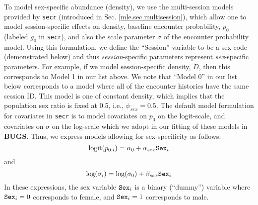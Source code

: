 To model sex-specific abundance (density), we  use the multi-session models  provided by
\mbox{\tt secr} (introduced in Sec. \ref{mle.sec.multisession}), which
allow one to model session-specific effects on density, baseline
encounter probability, $p_{0}$ (labeled $g_{0}$ in \mbox{\tt secr}), and also the scale
parameter $\sigma$ of the encounter probability model. Using this
formulation, we define the ``Session'' variable to be a sex code
(demonstrated below) and
thus {\it session}-specific parameters represent {\it sex}-specific parameters.
For example, if we model session-specific density, $D$, then this
corresponds to Model 1 in our list above.  We note that ``Model 0'' in
our list below corresponds to a model where all of the encounter
histories have the same session ID. This model is one of constant
density, which implies that the population sex ratio is fixed at 0.5, i.e.,
$\psi_{sex} = 0.5$. 
The default model formulation for covariates in \mbox{\tt secr} is to model covariates on $p_{0}$ on
the logit-scale, and covariates on $\sigma$ on the
log-scale which we adopt in our fitting of these models in {\bf
  BUGS}. Thus,  we express  models allowing for sex-specificity
as follows:
\[
 \mbox{logit}(p_{0,i}) = \alpha_{0} + \alpha_{sex} \mbox{\tt Sex}_{i}
\]
and
\[
 \mbox{log}(\sigma_{i}) = \log(\sigma_{0}) + \beta_{sex} \mbox{\tt Sex}_{i}
\]
In these expressions, the sex variable $\mbox{\tt Sex}_{i}$ is a
binary (``dummy'') variable where $\mbox{\tt Sex}_{i}= 0$ corresponds to female, and $\mbox{\tt Sex}_{i} = 1$
corresponds to male. 

